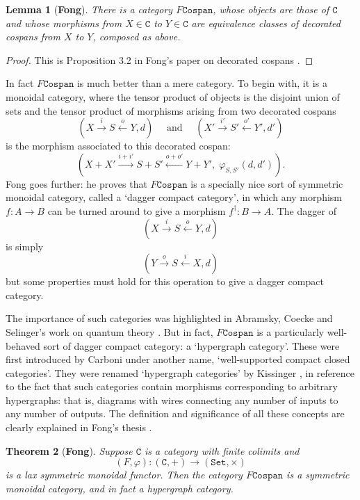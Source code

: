 \documentclass{compositionalityarticle}
\newcommand{\Set}{\mathtt{Set}}
\newcommand{\Cospan}{\mathtt{Cospan}}
\newcommand{\CC}{\mathtt{C}}
\newcommand{\maps}{\colon}
\theoremstyle{plain}
\newtheorem{thm}{Theorem}
\newtheorem{lem}[thm]{Lemma}
\theoremstyle{remark}
\begin{document}
\begin{lem}[\textbf{Fong}] \label{lemma:fcospans}
There is a category $F\Cospan$, whose objects are those of $\CC$ and whose
morphisms from $X \in \CC$ to $Y \in \CC$ are equivalence classes of decorated cospans from $X$ to $Y$, composed as above.  
\end{lem}

\begin{proof}
This is Proposition 3.2 in Fong's paper on decorated cospans \cite{Fong2015}.
\end{proof}

In fact $F\Cospan$ is much better than a mere category.  To begin with, it is
a monoidal category, where the tensor product of objects is the disjoint union of sets and the tensor product of morphisms arising from two decorated cospans 
\[
    (X \stackrel{i}{\longrightarrow} S \stackrel{o}{\longleftarrow} Y, d) 
    \quad \textrm{ and } \quad
    (X' \stackrel{i'}{\longrightarrow} S' \stackrel{o'}{\longleftarrow} Y', d')
  \]
is the morphism associated to this decorated cospan:
\[  ( X + X' \stackrel{i+i'}{\longrightarrow} S + S'  \stackrel{o + o'}{\longleftarrow} Y + Y', \;
\varphi_{S,S'}(d,d') ) .\]
Fong goes further: he proves that $F\Cospan$ is a specially nice sort of 
symmetric monoidal category, called a `dagger compact category',
in which any morphism $f \maps A \to B$ can be turned around to give a 
morphism $f^\dagger \maps B \to A$.  The dagger of 
\[
    (X \stackrel{i}{\longrightarrow} S \stackrel{o}{\longleftarrow} Y, d) 
\]
is simply 
\[
    (Y \stackrel{o}{\longrightarrow} S \stackrel{i}{\longleftarrow} X, d) 
\]
but some properties must hold for this operation to give a dagger compact category.

The importance of such categories was highlighted in Abramsky, Coecke and 
Selinger's work on quantum theory \cite{AC,Selinger}.   But in fact, 
$F\Cospan$ is a particularly well-behaved sort of dagger compact category: a 
`hypergraph category'.   These were first introduced by Carboni \cite{Carboni} under another name, `well-supported compact closed categories'.  They were renamed `hypergraph categories' by Kissinger \cite{Kissinger}, in reference to the fact that such categories contain morphisms corresponding to arbitrary hypergraphs: that is, diagrams with wires connecting any number of inputs to any number of outputs.   The definition and significance of all these concepts are clearly explained in Fong's thesis \cite{FongThesis}.  

\begin{thm}[\textbf{Fong}] \label{thm:fcospans}
  Suppose $\CC$ is a category with finite colimits and 
  \[
    (F,\varphi)\maps (\CC,+) \longrightarrow (\Set, \times)
  \]
is a lax symmetric monoidal functor.  Then the category $F\Cospan$ is a symmetric
monoidal category, and in fact a hypergraph
category.
\end{thm}
\end{document}
